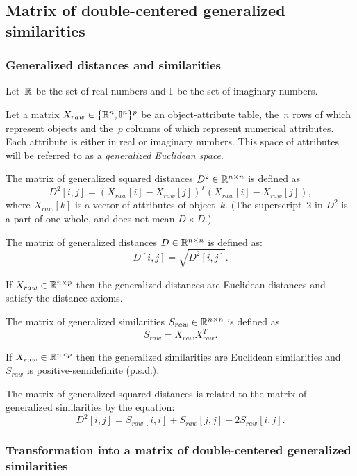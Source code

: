 \documentclass[10pt,a4paper]{article}
\begin{document}
\subsection {Matrix of double-centered generalized similarities}

\subsubsection {Generalized distances and similarities}

Let~$\mathbb R$ be the set of real numbers and $\mathbb I$ be the set of imaginary numbers.

Let a matrix $X_{raw} \in \{\mathbb R^n,\mathbb I^n\}^p$ be an object-attribute table, the~$n$ rows of which represent objects and the~$p$ columns of which represent numerical attributes.
Each attribute is either in real or imaginary numbers.
This space of attributes will be referred to as a {\em generalized Euclidean space}.

The matrix of generalized squared distances $D^2 \in \mathbb R^{n \times n}$ is defined as
$$ D^2[i,j] = (X_{raw}[i] - X_{raw}[j])^T (X_{raw}[i] - X_{raw}[j]),$$
where $X_{raw}[k]$ is a vector of attributes of object~$k$.
(The superscript~2 in $D^2$ is a part of one whole, and does not mean $D \times D$.)

The matrix of generalized distances $D \in \mathbb R^{n \times n}$ is defined as:
$$ D[i,j]  = \sqrt{D^2 [i,j]}. $$


If $X_{raw} \in \mathbb R^{n \times p}$ then the generalized distances are Euclidean distances and satisfy the distance axioms.

The matrix of generalized similarities $S_{raw} \in \mathbb R^{n \times n}$ is defined as
$$ S_{raw} = X_{raw} X_{raw}^T.$$

If $X_{raw} \in \mathbb R^{n \times p}$ then the generalized similarities are Euclidean similarities and $S_{raw}$ is positive-semidefinite (p.s.d.).


The matrix of generalized squared distances is related to the matrix of generalized similarities by the equation:
$$ D^2[i,j] = S_{raw}[i,i] + S_{raw}[j,j] - 2 S_{raw}[i,j].$$


\subsubsection {Transformation into a matrix of double-centered generalized similarities}
\end{document}

